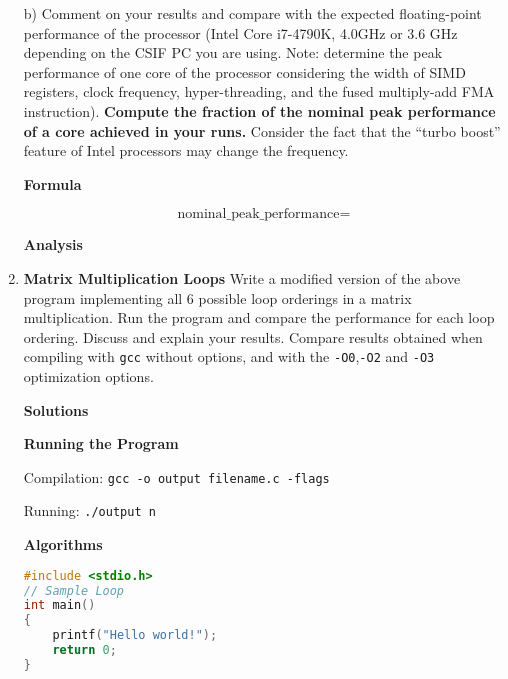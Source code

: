 \documentclass[12pt]{article}
\begin{document}
\begin{enumerate}
        b) Comment on your results and compare with the expected floating-point performance of the processor (Intel Core i7-4790K, 4.0GHz or 3.6 GHz depending on the CSIF PC you are using. Note: determine the peak performance of one core of the processor considering the width of SIMD registers, clock frequency, hyper-threading, and the fused multiply-add FMA instruction).\textbf{ Compute the fraction of the nominal peak performance of a core achieved in your runs.}  Consider the fact that the “turbo boost” feature of Intel processors may change the frequency.

        \textbf{Formula}

        \begin{mdframed}
          $$\text{nominal\_peak\_performance} = $$
        \end{mdframed}

        \textbf{Analysis}

        \begin{mdframed}
          \vspace{1in}
        \end{mdframed}


  \item \textbf{Matrix Multiplication Loops}
        Write a modified version of the above program implementing all 6 possible loop orderings in a matrix multiplication.
        Run the program and compare the performance for each loop ordering. Discuss and explain your results.  Compare results obtained when compiling with \lstinline$gcc$ without options, and with the \lstinline$-O0$,\lstinline$-O2$ and \lstinline$-O3$ optimization options.

        \textbf{Solutions}

        \textbf{Running the Program}

        \begin{mdframed}
          Compilation: \lstinline{gcc -o output filename.c -flags}

          Running: \lstinline{./output n}

        \end{mdframed}

        \textbf{Algorithms}

        \begin{lstlisting}[language=C]
#include <stdio.h>
// Sample Loop
int main()
{
    printf("Hello world!");
    return 0;
}
\end{lstlisting}



\end{enumerate}
\end{document}
